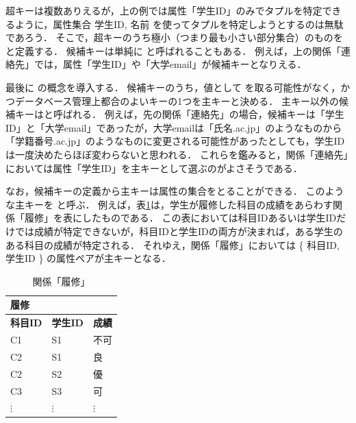 超キーは複数ありえるが，上の例では属性「学生ID」のみでタプルを特定できるように，属性集合 { 学生ID, 名前 } を使ってタプルを特定しようとするのは無駄であろう．
そこで，超キーのうち極小（つまり最も小さい部分集合）のものを と定義する．
候補キーは単純に と呼ばれることもある．
例えば，上の関係「連絡先」では，属性「学生ID」や「大学email」が候補キーとなりえる．

最後に の概念を導入する．
候補キーのうち，値として を取る可能性がなく，かつデータベース管理上都合のよいキーの1つを主キーと決める．
主キー以外の候補キーはと呼ばれる．
例えば，先の関係「連絡先」の場合，候補キーは「学生ID」と「大学email」であったが，大学emailは「氏名\@xxx.ac.jp」のようなものから「学籍番号\@xxx.ac.jp」のようなものに変更される可能性があったとしても，学生IDは一度決めたらほぼ変わらないと思われる．
これらを鑑みると，関係「連絡先」においては属性「学生ID」を主キーとして選ぶのがよさそうである．

なお，候補キーの定義から主キーは属性の集合をとることができる．
このような主キーを と呼ぶ．
例えば，表\ref{tab:course-completion-relation}は，学生が履修した科目の成績をあらわす関係「履修」を表にしたものである．
この表においては科目IDあるいは学生IDだけでは成績が特定できないが，科目IDと学生IDの両方が決まれば，ある学生のある科目の成績が特定される．
それゆえ，関係「履修」においては \{ 科目ID, 学生ID \} の属性ペアが主キーとなる．

\begin{table}[tb]
\centering
\caption{関係「履修」}
\label{tab:course-completion-relation}
\begin{tabular}{@{}lll@{}}
履修            &               &             \\ \midrule
\textbf{科目ID} & \textbf{学生ID} & \textbf{成績} \\ \midrule
C1            & S1            & 不可          \\
C2            & S1            & 良           \\
C2            & S2            & 優           \\
C3            & S3            & 可           \\
$\vdots$      & $\vdots$      & $\vdots$    \\ \bottomrule
\end{tabular}
\end{table}

